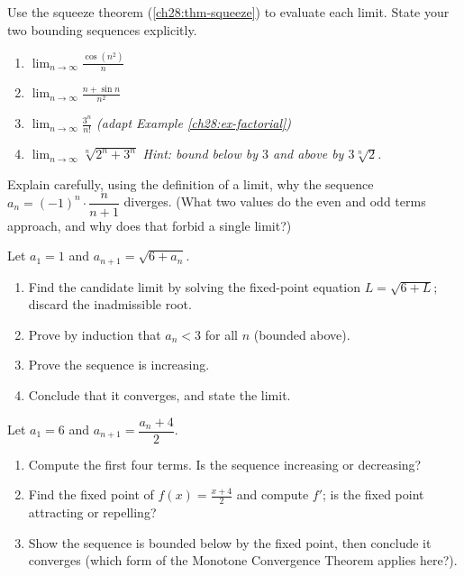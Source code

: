\begin{exercise}
\label{ch28:exr-squeeze}
Use the squeeze theorem (\ref{ch28:thm-squeeze}) to evaluate each limit. State
your two bounding sequences explicitly.
\begin{enumerate}[label=(\alph*)]
  \item $\displaystyle\lim_{n\to\infty} \frac{\cos(n^2)}{n}$
  \item $\displaystyle\lim_{n\to\infty} \frac{n + \sin n}{n^2}$
  \item $\displaystyle\lim_{n\to\infty} \frac{3^n}{n!}$ \emph{(adapt Example
        \ref{ch28:ex-factorial})}
  \item $\displaystyle\lim_{n\to\infty} \sqrt[n]{2^n + 3^n}$
        \emph{Hint: bound below by $3$ and above by $3\sqrt[n]{2}$.}
\end{enumerate}
\end{exercise}

\begin{exercise}
\label{ch28:exr-oscillate}
Explain carefully, using the definition of a limit, why the sequence $a_n =
(-1)^n \cdot \dfrac{n}{n+1}$ diverges. (What two values do the even and odd
terms approach, and why does that forbid a single limit?)
\end{exercise}

\begin{exercise}
\label{ch28:exr-mct-recursion}
Let $a_1 = 1$ and $a_{n+1} = \sqrt{6 + a_n}$.
\begin{enumerate}[label=(\alph*)]
  \item Find the candidate limit by solving the fixed-point equation $L =
        \sqrt{6 + L}$; discard the inadmissible root.
  \item Prove by induction that $a_n < 3$ for all $n$ (bounded above).
  \item Prove the sequence is increasing.
  \item Conclude that it converges, and state the limit.
\end{enumerate}
\end{exercise}

\begin{exercise}
\label{ch28:exr-decreasing}
Let $a_1 = 6$ and $a_{n+1} = \dfrac{a_n + 4}{2}$.
\begin{enumerate}[label=(\alph*)]
  \item Compute the first four terms. Is the sequence increasing or decreasing?
  \item Find the fixed point of $f(x) = \tfrac{x+4}{2}$ and compute $f'$; is the
        fixed point attracting or repelling?
  \item Show the sequence is bounded below by the fixed point, then conclude it
        converges (which form of the Monotone Convergence Theorem applies here?).
\end{enumerate}
\end{exercise}

